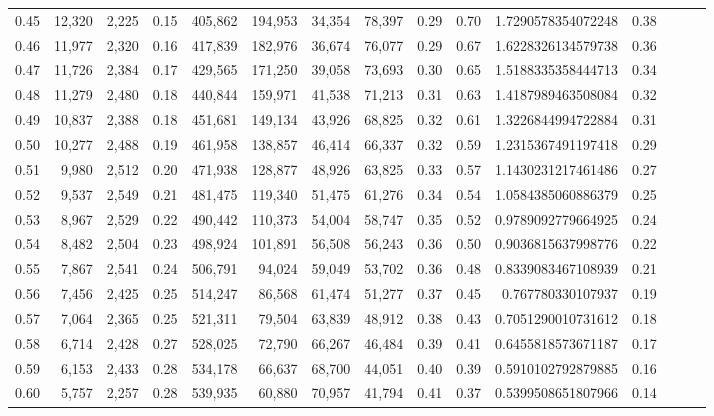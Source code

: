 \begin{tabular}{rrrrrrrrrrrrrrr}
0.45 &  12,320 &  2,225 &  0.15 &  405,862 &  194,953 &   34,354 &   78,397 &  0.29 &  0.70 &    1.7290578354072248 &      0.38 \\
0.46 &  11,977 &  2,320 &  0.16 &  417,839 &  182,976 &   36,674 &   76,077 &  0.29 &  0.67 &    1.6228326134579738 &      0.36 \\
0.47 &  11,726 &  2,384 &  0.17 &  429,565 &  171,250 &   39,058 &   73,693 &  0.30 &  0.65 &    1.5188335358444713 &      0.34 \\
0.48 &  11,279 &  2,480 &  0.18 &  440,844 &  159,971 &   41,538 &   71,213 &  0.31 &  0.63 &    1.4187989463508084 &      0.32 \\
0.49 &  10,837 &  2,388 &  0.18 &  451,681 &  149,134 &   43,926 &   68,825 &  0.32 &  0.61 &    1.3226844994722884 &      0.31 \\
0.50 &  10,277 &  2,488 &  0.19 &  461,958 &  138,857 &   46,414 &   66,337 &  0.32 &  0.59 &    1.2315367491197418 &      0.29 \\
0.51 &   9,980 &  2,512 &  0.20 &  471,938 &  128,877 &   48,926 &   63,825 &  0.33 &  0.57 &    1.1430231217461486 &      0.27 \\
0.52 &   9,537 &  2,549 &  0.21 &  481,475 &  119,340 &   51,475 &   61,276 &  0.34 &  0.54 &    1.0584385060886379 &      0.25 \\
0.53 &   8,967 &  2,529 &  0.22 &  490,442 &  110,373 &   54,004 &   58,747 &  0.35 &  0.52 &    0.9789092779664925 &      0.24 \\
0.54 &   8,482 &  2,504 &  0.23 &  498,924 &  101,891 &   56,508 &   56,243 &  0.36 &  0.50 &    0.9036815637998776 &      0.22 \\
0.55 &   7,867 &  2,541 &  0.24 &  506,791 &   94,024 &   59,049 &   53,702 &  0.36 &  0.48 &    0.8339083467108939 &      0.21 \\
0.56 &   7,456 &  2,425 &  0.25 &  514,247 &   86,568 &   61,474 &   51,277 &  0.37 &  0.45 &     0.767780330107937 &      0.19 \\
0.57 &   7,064 &  2,365 &  0.25 &  521,311 &   79,504 &   63,839 &   48,912 &  0.38 &  0.43 &    0.7051290010731612 &      0.18 \\
0.58 &   6,714 &  2,428 &  0.27 &  528,025 &   72,790 &   66,267 &   46,484 &  0.39 &  0.41 &    0.6455818573671187 &      0.17 \\
0.59 &   6,153 &  2,433 &  0.28 &  534,178 &   66,637 &   68,700 &   44,051 &  0.40 &  0.39 &    0.5910102792879885 &      0.16 \\
0.60 &   5,757 &  2,257 &  0.28 &  539,935 &   60,880 &   70,957 &   41,794 &  0.41 &  0.37 &    0.5399508651807966 &      0.14 \\

\end{tabular}
